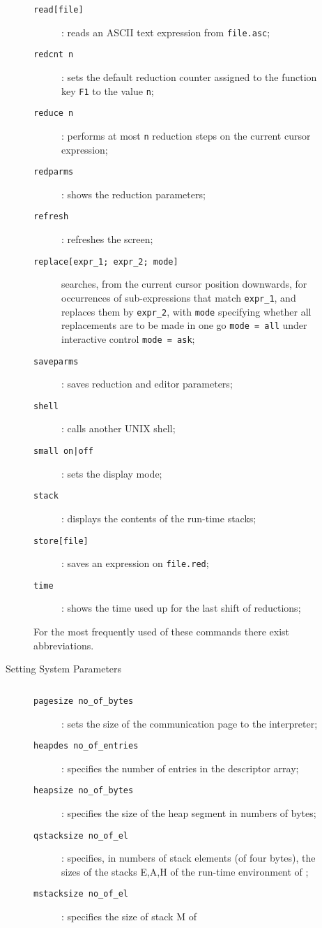 \begin{description}
\begin{description}
\begin{description}
\item[{\tt read[file]}]: reads an ASCII text expression from {\tt file.asc};
\item[{\tt redcnt n}]: sets the default reduction counter assigned to
 the function key {\tt F1} to the value {\tt n};
\item[{\tt reduce n}]: performs at most {\tt n} reduction steps on the
current cursor expression;
\item[{\tt redparms}]: shows the reduction parameters;
\item[{\tt refresh}]: refreshes the screen;
\item[{\tt replace[expr\_1; expr\_2; mode]}] searches, from the current cursor position
downwards, for occurrences of sub-expressions that match {\tt expr\_1}, and replaces
them by {\tt expr\_2}, with {\tt mode} specifying whether all replacements are to
be made in one go {\tt mode = all} under interactive control {\tt mode = ask}; 
\item[{\tt saveparms}]: saves reduction and editor parameters;
\item[{\tt shell}]: calls another UNIX shell;
\item[{\tt small on|off}]: sets the display mode;
\item[{\tt stack}]: displays the contents of the \pired run-time stacks;
\item[{\tt store[file]}]: saves an expression on {\tt file.red};
\item[{\tt time}]: shows the time used up for the last shift of
reductions;
\end{description}
For the most frequently used of these commands there exist abbreviations.
\\
\item[{\rm Setting System Parameters}]$\;$\\ 
\begin{description}
\item[{\tt pagesize no\_of\_bytes}]: sets the size of the communication page
to the \pired interpreter;
\item[{\tt heapdes no\_of\_entries}]: specifies the number of entries in
the descriptor array;
\item[{\tt heapsize no\_of\_bytes}]: specifies the size of the heap segment in numbers of bytes;
\item[{\tt qstacksize no\_of\_el}]:  specifies, in numbers of stack elements (of four bytes), the sizes of the stacks E,A,H of the run-time
environment of \pired;
\item[{\tt mstacksize no\_of\_el}]: specifies the size of stack M of

\end{description}
\end{description}
\end{description}
